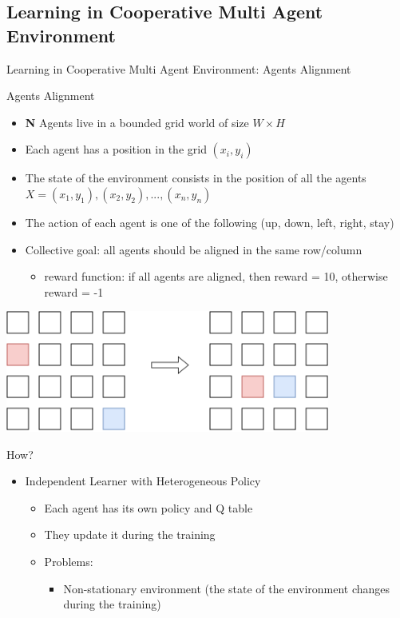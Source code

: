 \documentclass[presentation, 8pt]{beamer}\mode<presentation>{\usetheme{AMSBolognaFC}}
\begin{document}
\subsection{Learning in Cooperative Multi Agent Environment}
\begin{frame}[allowframebreaks]{Learning in Cooperative Multi Agent Environment: Agents Alignment}
\begin{exampleblock}{Agents Alignment}
	\begin{itemize}
		\item \textbf{N} Agents live in a bounded grid world of size $W \times H$
		\item Each agent has a position in the grid $(x_i, y_i)$
		\item The state of the environment consists in the position of all the agents $X = {(x_1, y_1), (x_2, y_2), ..., (x_n, y_n)}$
		\item The action of each agent is one of the following (up, down, left, right, stay)
		\item Collective goal: all agents should be aligned in the same row/column
		\begin{itemize}
			\item reward function: if all agents are aligned, then reward = 10, otherwise reward = -1
		\end{itemize}
	\end{itemize}
\end{exampleblock}
\centering
\includegraphics[width=0.8\textwidth]{img/agent-modelling.pdf}
\begin{alertblock}{How?}
	\begin{itemize}
		\item Independent Learner with Heterogeneous Policy
		\begin{itemize}
			\item Each agent has its own policy and Q table
			\item They update it during the training
			\item Problems:
			\begin{itemize}
				\item Non-stationary environment (the state of the environment changes during the training)

\end{itemize}
\end{itemize}
\end{itemize}
\end{alertblock}
\end{frame}
\end{document}
